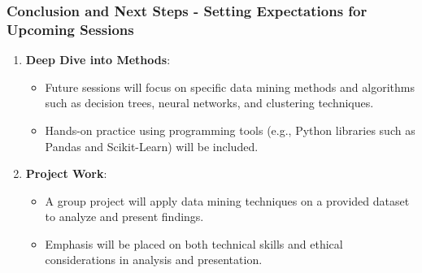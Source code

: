 \documentclass[aspectratio=169]{beamer}
\begin{document}
\begin{frame}[fragile]
    \frametitle{Conclusion and Next Steps - Setting Expectations for Upcoming Sessions}
    \begin{enumerate}
        \item \textbf{Deep Dive into Methods}:
        \begin{itemize}
            \item Future sessions will focus on specific data mining methods and algorithms such as decision trees, neural networks, and clustering techniques.
            \item Hands-on practice using programming tools (e.g., Python libraries such as Pandas and Scikit-Learn) will be included.
        \end{itemize}

        \item \textbf{Project Work}:
        \begin{itemize}
            \item A group project will apply data mining techniques on a provided dataset to analyze and present findings.
            \item Emphasis will be placed on both technical skills and ethical considerations in analysis and presentation.
        \end{itemize}
    \end{enumerate}
\end{frame}
\end{document}
